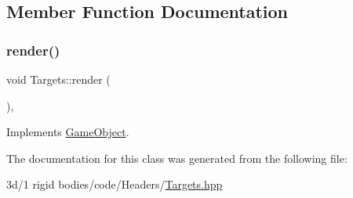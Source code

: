\subsection{Member Function Documentation}
\mbox{\label{class_targets_ae4f6dccb119a885728dc9e9c3e287c95}} 
\subsubsection{\texorpdfstring{render()}{render()}}
{\footnotesize\ttfamily void Targets\+::render (\begin{DoxyParamCaption}{ }\end{DoxyParamCaption})\hspace{0.3cm}{\ttfamily [override]}, {\ttfamily [virtual]}}



Implements \mbox{\hyperlink{class_game_object_adee58d508cfa907162d1192a25dc21b9}{Game\+Object}}.



The documentation for this class was generated from the following file\+:\begin{DoxyCompactItemize}
\item 
3d/1 rigid bodies/code/\+Headers/\mbox{\hyperlink{_targets_8hpp}{Targets.\+hpp}}\end{DoxyCompactItemize}
